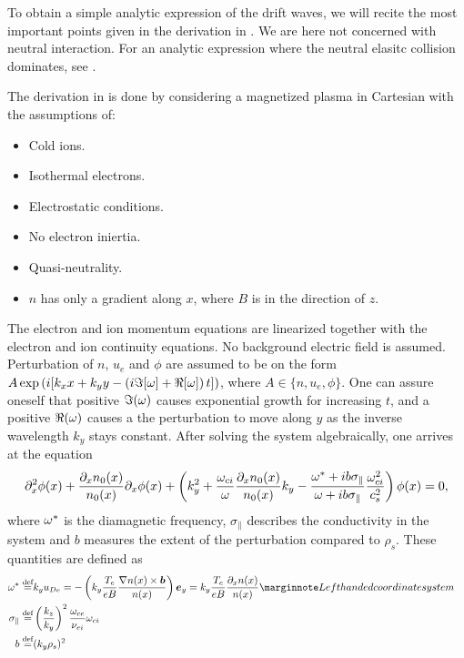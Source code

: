 To obtain a simple analytic expression of the drift waves, we will recite the most important points given in the derivation in \cite{Pecseli2016book}.
We are here not concerned with neutral interaction.
For an analytic expression where the neutral elasitc collision dominates, see \cite{Ellis1980}.

The derivation in \cite{Pecseli2016book} is done by considering a magnetized plasma in Cartesian with the assumptions of:
%
\begin{itemize}[noitemsep]
    \item Cold ions.
    \item Isothermal electrons.
    \item Electrostatic conditions.
    \item No electron iniertia.
    \item Quasi-neutrality.
    \item $n$ has only a gradient along $x$, where $B$ is in the direction of $z$.
\end{itemize}
%
The electron and ion momentum equations are linearized together with the electron and ion continuity equations.
No background electric field is assumed.
Perturbation of $n$, $u_e$ and $\phi$ are assumed to be on the form $A\exp\left(i[k_x x + k_y y - \left(i\Im[\omega] + \Re[\omega]\right) t]\right)$, where $A \in \{n, u_e, \phi\}$.
One can assure oneself that positive $\Im(\omega)$ causes exponential growth for increasing $t$, and a positive $\Re(\omega)$ causes a the perturbation to move along $y$ as the inverse wavelength $k_y$ stays constant.
After solving the system algebraically, one arrives at the equation
%
\begin{align}
    \partial_x^2 \phi(x) +
    \frac{\partial_x n_0(x)}{n_0(x)}\partial_x \phi(x)+
    \left(k_y^2 +
    \frac{\omega_{ci}}{\omega}\frac{\partial_x n_0(x)}{n_0(x)}k_y -
    \frac{\omega^*+ib\sigma_\|}{\omega+ib\sigma_\|}\frac{\omega_{ci}^2}{c_s^2}
    \right)\phi(x)
    =0,
    \label{eq:fullDisp}
\end{align}
%
where $\omega^*$ is the diamagnetic frequency, $\sigma_\|$ describes the conductivity in the system and $b$ measures the extent of the perturbation compared to $\rho_s$.
These quantities are defined as
%
\begin{align*}
    \om^* \defined& k_y u_{De} =
    -\L(k_y \frac{T_e}{eB}\frac{\grad n(x)\times \ve{b}}{n(x)}\R)\ve{e}_y
    =
    k_y \frac{T_e}{eB}\frac{\partial_x n(x)}{n(x)}
    \note{Left handed coordinate system}
    \\
    \sigma_\| \defined& \L(\frac{k_z}{k_y}\R)^2 \frac{\om_{ce}}{\nu_{ei}}\om_{ci}\\
    b \defined& (k_y \rho_s)^2&
\end{align*}
